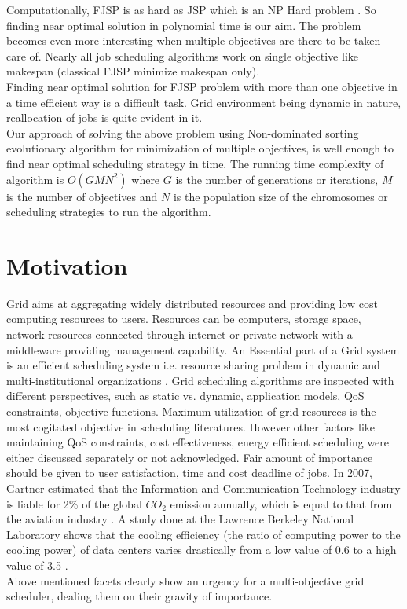 Computationally, FJSP is as hard as JSP which is an NP Hard problem\cite{garey1979computers} . So finding near optimal solution in polynomial time is our aim. The problem becomes even more interesting when multiple objectives are there to be taken care of.  Nearly all job scheduling algorithms work on single objective like makespan (classical FJSP minimize makespan only).\\
Finding near optimal solution for FJSP problem with more than one objective in a time efficient way is a difficult task. Grid environment being dynamic in nature, reallocation of jobs is quite evident in it. \\
Our approach of solving the above problem using Non-dominated sorting evolutionary algorithm for minimization of multiple objectives, is well enough to find near optimal scheduling strategy in time. The running time complexity of algorithm is $O(GMN^2)$ where $G$ is the number of generations or iterations, $M$ is the number of objectives and $N$ is the population size of the chromosomes or scheduling strategies to run the algorithm.\\

\section{Motivation}
Grid aims at aggregating widely distributed resources and providing low cost computing resources to users. Resources can be computers, storage space, network resources connected through internet or private network with a middleware providing management capability. An Essential part of a Grid system is an efficient scheduling system i.e. resource sharing problem in dynamic and multi-institutional organizations \cite{foster2001anatomy}. Grid scheduling algorithms are inspected with different perspectives, such as static vs. dynamic, application models, QoS constraints, objective functions. Maximum utilization of grid resources is the most cogitated objective in scheduling literatures. However other factors like maintaining QoS constraints, cost effectiveness, energy efficient scheduling were either discussed separately or not acknowledged. Fair amount of importance should be given to user satisfaction, time and cost deadline of jobs. In 2007, Gartner estimated that the Information and Communication Technology industry is liable for 2\% of the global $CO_2$ emission annually, which is equal to that from the aviation industry \cite{pettey2007gartner}. A study done at the Lawrence Berkeley National Laboratory shows that the cooling efficiency (the ratio of computing power to the cooling power) of data centers varies drastically from a low value of 0.6 to a high value of 3.5 \cite{greenberg2006best}. \\
Above mentioned facets clearly show an urgency for a multi-objective grid scheduler, dealing them on their gravity of importance.
